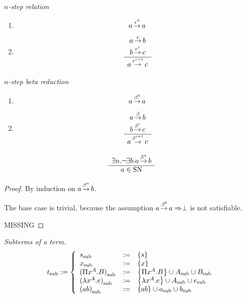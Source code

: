 \begin{definition}
    \emph{$n$-step relation}
    \begin{enumerate}
        \item $$ a {{\,\stackrel{{r}^{0}}{\to}\,}} a$$

        \item $$
            \begin{array}{c} 
                a {\,\stackrel{r}{\to}\,} b
                \\
                b {{\,\stackrel{{r}^{i}}{\to}\,}} c
             \\ \hline 
                a {{\,\stackrel{{r}^{i+1}}{\to}\,}} c
            \end{array}
            $$
    \end{enumerate}
\end{definition}






\begin{definition}
    \emph{$n$-step beta reduction}
    \begin{enumerate}
        \item $$ a {{{\,\stackrel{{\beta}^{0}}{\to}\,}}} a$$

        \item $$
            \begin{array}{c} 
                a {\,\stackrel{\beta}{\to}\,} b
                \\
                b {{{\,\stackrel{{\beta}^{i}}{\to}\,}}} c
             \\ \hline 
                a {{{\,\stackrel{{\beta}^{i+1}}{\to}\,}}} c
            \end{array}
            $$
    \end{enumerate}
\end{definition}


\begin{theorem}
    $$
    \begin{array}{c} 
        \exists n. \lnot \exists b. a {{{\,\stackrel{{\beta}^{n}}{\to}\,}}} b
     \\ \hline 
        a \in {\text{SN}}
    \end{array}
    $$
    \begin{proof}

        By induction on $a {{{\,\stackrel{{\beta}^{n}}{\to}\,}}} b$.

        The base case is trivial, because the assumption $a {{{\,\stackrel{{\beta}^{0}}{\to}\,}}} a \Rightarrow
        \perp$ is not satisfiable.

        MISSING
    \end{proof}
\end{theorem}







\begin{definition}
    \emph{Subterms of a term.}
    $$
    {{t}_{\text{sub}}} :=
    \left\{ \begin{array}{llll} 
        {{s}_{\text{sub}}} &:=& {\left\{s\right\}}
        \\
        {{x}_{\text{sub}}} &:=& {\left\{x\right\}}
        \\
        {{(\Pi x^A.B)}_{\text{sub}}} &:=&
            {\left\{\Pi x^A. B\right\}} \cup {{A}_{\text{sub}}} \cup {{B}_{\text{sub}}}
        \\
        {{(\lambda x^A.e)}_{\text{sub}}} &:=&
            {\left\{\lambda x^A. e\right\}} \cup {{A}_{\text{sub}}} \cup {{e}_{\text{sub}}}
        \\
        {{(a b)}_{\text{sub}}} &:=&
            {\left\{ab\right\}} \cup {{a}_{\text{sub}}} \cup {{b}_{\text{sub}}}
     \end{array} \right.
    $$
\end{definition}







